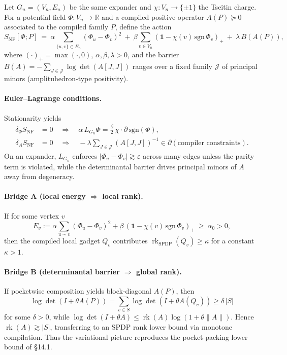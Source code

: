 \documentclass[12pt]{article}
\theoremstyle{definition}
\theoremstyle{definition}
\theoremstyle{remark}
\theoremstyle{remark}
\begin{document}
Let $G_n=(V_n,E_n)$ be the same expander and $\chi: V_n\to\{\pm 1\}$ the Tseitin charge. For a potential field $\Phi: V_n\to\mathbb{R}$ and a compiled positive operator $A(P)\succeq 0$ associated to the compiled family $P$, define the action
\[
S_{\mathrm{NF}}[\Phi; P]\ =\ \alpha\sum_{\{u,v\}\in E_n}\!(\Phi_u-\Phi_v)^2\ +\ \beta\sum_{v\in V_n}\!(\mathbf{1}-\chi(v)\,\mathrm{sgn}\,\Phi_v)_+\ +\ \lambda\,B(A(P)),
\]
where $(\cdot)_+=\max(\cdot,0)$, $\alpha,\beta,\lambda>0$, and the barrier $B(A)=-\sum_{J\in\mathcal{J}}\log\det(A[J,J])$ ranges over a fixed family $\mathcal{J}$ of principal minors (amplituhedron-type positivity).

\paragraph{Euler--Lagrange conditions.} Stationarity yields
\begin{align*}
\delta_\Phi S_{\mathrm{NF}} &= 0\quad\Rightarrow\quad \alpha\, L_{G_n}\Phi = \tfrac{\beta}{2}\,\chi\cdot\partial\,\mathrm{sgn}(\Phi),\\
\delta_A S_{\mathrm{NF}} &= 0\quad\Rightarrow\quad -\lambda\!\sum_{J\in\mathcal{J}}\!(A[J,J])^{-1}\in\partial(\text{compiler constraints}).
\end{align*}
On an expander, $L_{G_n}$ enforces $|\Phi_u-\Phi_v|\gtrsim\varepsilon$ across many edges unless the parity term is violated, while the determinantal barrier drives principal minors of $A$ away from degeneracy.

\paragraph{Bridge A (local energy $\Rightarrow$ local rank).} If for some vertex $v$
\[
E_v := \alpha\!\sum_{u\sim v}(\Phi_u-\Phi_v)^2 + \beta\,(\mathbf{1}-\chi(v)\,\mathrm{sgn}\,\Phi_v)_+\ \ge\ \alpha_0>0,
\]
then the compiled local gadget $Q_v$ contributes $\operatorname{rk}_{\mathrm{SPDP}}(Q_v)\ge\kappa$ for a constant $\kappa>1$.

\paragraph{Bridge B (determinantal barrier $\Rightarrow$ global rank).} If pocketwise composition yields block-diagonal $A(P)$, then
\[
\log\det(I+\theta A(P))=\sum_{v\in S}\log\det(I+\theta A(Q_v))\ge\delta\,|S|
\]
for some $\delta>0$, while $\log\det(I+\theta A)\le\operatorname{rk}(A)\log(1+\theta\|A\|)$. Hence $\operatorname{rk}(A)\gtrsim |S|$, transferring to an SPDP rank lower bound via monotone compilation. Thus the variational picture reproduces the pocket-packing lower bound of \S14.1.
\end{document}
